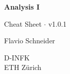\documentclass[8pt,a4paper]{extarticle}     %
\theoremstyle{definition}
\theoremstyle{definition}
\theoremstyle{definition}
\begin{document}
\begin{titlepage}
    \begin{center}
		\vspace*{1cm}
		
		\Huge
        \textbf{Analysis I}
        
		\vspace{0.5cm}
		\Large
        Cheat Sheet $\cdot$ v1.0.1
        
        \vfill
        
        Flavio Schneider
        
		\vspace{0.8cm}
		
        D-INFK\\
        ETH Zürich       
    \end{center}
\end{titlepage}
\end{document}
